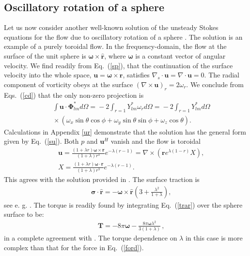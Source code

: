 \documentclass[aps,prx,twocolumn,amsmath,amssymb,amsfonts]{revtex4-2}
\begin{document}
{\subsection{Oscillatory rotation of a sphere} \label{oscillatory}

Let us now consider another well-known solution of the unsteady Stokes equations for the flow due to oscillatory rotation of a sphere \cite{kim}. The solution is an example of a purely toroidal flow. In the frequency-domain, the flow at the surface of the unit sphere is $\bm \omega\times  \bm {\hat r}$, where $\bm \omega$ is a constant vector of angular velocity. We find readily from Eq.~(\ref{sp}), that the continuation of the surface velocity into the whole space, $\bm u=\bm \omega\times  \bm r$, satisfies $\nabla_s\cdot\bm u=\nabla\cdot \bm u=0$. The radial component of vorticity obeys at the surface $(\nabla\times \bm u)_r=2 \omega_r$. We conclude from Eqs.~(\ref{cd}) that the only non-zero projection is
\begin{eqnarray}&&\!\!\!\!\!\!\!
\int \bm u\cdot \bm \Phi_{lm}^* d\Omega\!=\!-2\int_{r=1}  Y_{lm}^* \omega_r d\Omega\!=\!-2\int_{r=1}  Y_{lm}^* d\Omega
\nonumber\\&&\!\!\!\!\!\!\!\times \left(\omega_x \sin\theta\cos\phi
+\omega_y \sin\theta\sin\phi+\omega_z \cos\theta\right) .
\end{eqnarray}
Calculations in Appendix \ref{ur} demonstrate that the solution has the general form given by Eq.~(\ref{su}). Both $p$ and $\bm u^H$ vanish and the flow is toroidal
\begin{eqnarray}&&
\bm u\!=\!\frac{(1\!+\!\lambda r)\bm \omega\times\bm r}{(1\!+\!\lambda)r^3}e^{-\lambda(r-1)}=\nabla\times (\bm r e^{\lambda (1-r)}X ),\nonumber\\&&
X=\frac{(1\!+\!\lambda r)\bm \omega\cdot\bm r}{(1\!+\!\lambda)r^3}e^{-\lambda(r-1)}. \label{ror}
\end{eqnarray}
This agrees with the solution provided in \cite{LL}. The surface traction is
\begin{eqnarray}&&\!\!\!\!\!\!\!\!\!\!\!\!\!
\bm\sigma\cdot \bm {\hat r}=-\bm \omega\times\bm {\hat r} \left(3+\frac{\lambda^2}{1+\lambda}\right),  \label{trar}
\end{eqnarray}
see e. g. \cite{for}. The torque is readily found by integrating Eq.~(\ref{trar}) over the sphere surface to be:
\begin{eqnarray}&&\!\!\!\!\!\!\!\!\!\!\!\!\!
\bm T=-8\pi\bm \omega-\frac{8\pi\bm \omega \lambda^2}{3(1+\lambda)}\,, \label{toq}
\end{eqnarray}
in a complete agreement with \cite{kim}. The torque dependence on $\lambda$ in this case is more complex than that for the force in Eq.~(\ref{ford}).

}
\end{document}
